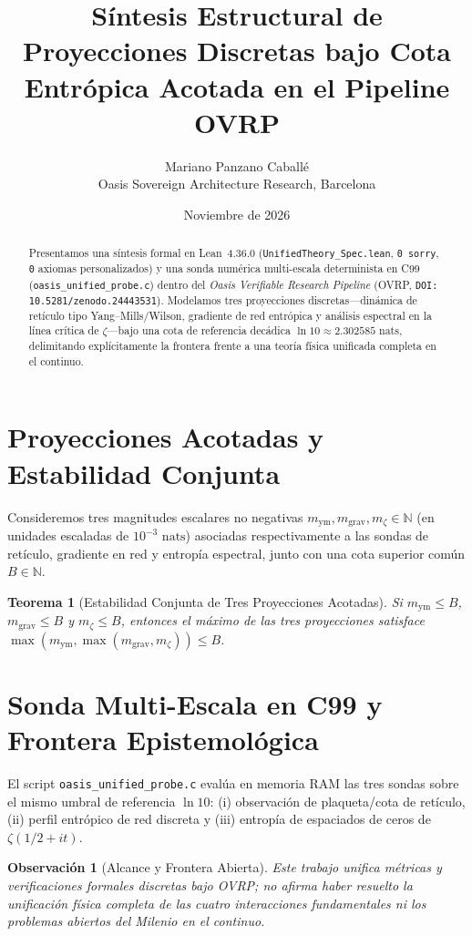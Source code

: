\documentclass[11pt,a4paper]{article}
\title{S\'intesis Estructural de Proyecciones Discretas bajo Cota Entr\'opica Acotada en el Pipeline OVRP}
\author{Mariano Panzano Caball\'e \\ \small Oasis Sovereign Architecture Research, Barcelona}
\date{Noviembre de 2026}
\newtheorem{theorem}{Teorema}
\newtheorem{remark}{Observaci\'on}
\begin{document}
\maketitle

\begin{abstract}
Presentamos una s\'intesis formal en Lean~4.36.0 (\texttt{UnifiedTheory\_Spec.lean}, \texttt{0 sorry}, \texttt{0} axiomas personalizados) y una sonda num\'erica multi-escala determinista en C99 (\texttt{oasis\_unified\_probe.c}) dentro del \emph{Oasis Verifiable Research Pipeline} (OVRP, \texttt{DOI: 10.5281/zenodo.24443531}). Modelamos tres proyecciones discretas---din\'amica de ret\'iculo tipo Yang--Mills/Wilson, gradiente de red entr\'opica y an\'alisis espectral en la l\'inea cr\'itica de $\zeta$---bajo una cota de referencia dec\'adica $\ln 10 \approx 2.302585\text{ nats}$, delimitando expl\'icitamente la frontera frente a una teor\'ia f\'isica unificada completa en el continuo.
\end{abstract}

\section{Proyecciones Acotadas y Estabilidad Conjunta}
Consideremos tres magnitudes escalares no negativas $m_{\mathrm{ym}}, m_{\mathrm{grav}}, m_{\zeta} \in \mathbb{N}$ (en unidades escaladas de $10^{-3}\text{ nats}$) asociadas respectivamente a las sondas de ret\'iculo, gradiente en red y entrop\'ia espectral, junto con una cota superior com\'un $B \in \mathbb{N}$.

\begin{theorem}[Estabilidad Conjunta de Tres Proyecciones Acotadas]
Si $m_{\mathrm{ym}} \le B$, $m_{\mathrm{grav}} \le B$ y $m_{\zeta} \le B$, entonces el m\'aximo de las tres proyecciones satisface $\max(m_{\mathrm{ym}}, \max(m_{\mathrm{grav}}, m_{\zeta})) \le B$.
\end{theorem}

\section{Sonda Multi-Escala en C99 y Frontera Epistemol\'ogica}
El script \texttt{oasis\_unified\_probe.c} eval\'ua en memoria RAM las tres sondas sobre el mismo umbral de referencia $\ln 10$: (i) observaci\'on de plaqueta/cota de ret\'iculo, (ii) perfil entr\'opico de red discreta y (iii) entrop\'ia de espaciados de ceros de $\zeta(1/2+it)$.

\begin{remark}[Alcance y Frontera Abierta]
Este trabajo unifica m\'etricas y verificaciones formales discretas bajo OVRP; no afirma haber resuelto la unificaci\'on f\'isica completa de las cuatro interacciones fundamentales ni los problemas abiertos del Milenio en el continuo.
\end{remark}
\end{document}
